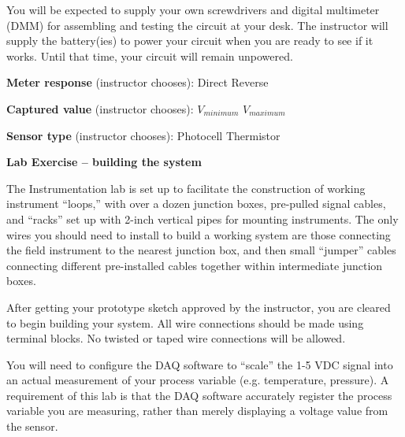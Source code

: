 \vskip 10pt

You will be expected to supply your own screwdrivers and digital multimeter (DMM) for assembling and testing the circuit at your desk.  The instructor will supply the battery(ies) to power your circuit when you are ready to see if it works.  Until that time, your circuit will remain unpowered.

\vskip 10pt

\noindent
{\bf Meter response} (instructor chooses): \hskip 20pt \underbar{\hskip 20pt} Direct \hskip 20pt \underbar{\hskip 20pt} Reverse

\vskip 10pt

\noindent
{\bf Captured value} (instructor chooses): \hskip 20pt \underbar{\hskip 20pt} $V_{minimum}$ \hskip 20pt \underbar{\hskip 20pt} $V_{maximum}$

\vskip 10pt

\noindent
{\bf Sensor type} (instructor chooses): \hskip 20pt \underbar{\hskip 20pt} Photocell \hskip 20pt \underbar{\hskip 20pt} Thermistor








\vfil \eject

\noindent
{\bf Lab Exercise -- building the system}

\vskip 5pt

The Instrumentation lab is set up to facilitate the construction of working instrument ``loops,'' with over a dozen junction boxes, pre-pulled signal cables, and ``racks'' set up with 2-inch vertical pipes for mounting instruments.  The only wires you should need to install to build a working system are those connecting the field instrument to the nearest junction box, and then small ``jumper'' cables connecting different pre-installed cables together within intermediate junction boxes.

After getting your prototype sketch approved by the instructor, you are cleared to begin building your system.  All wire connections should be made using terminal blocks.  No twisted or taped wire connections will be allowed.

\vskip 10pt

You will need to configure the DAQ software to ``scale'' the 1-5 VDC signal into an actual measurement of your process variable (e.g. temperature, pressure).  A requirement of this lab is that the DAQ software accurately register the process variable you are measuring, rather than merely displaying a voltage value from the sensor.

